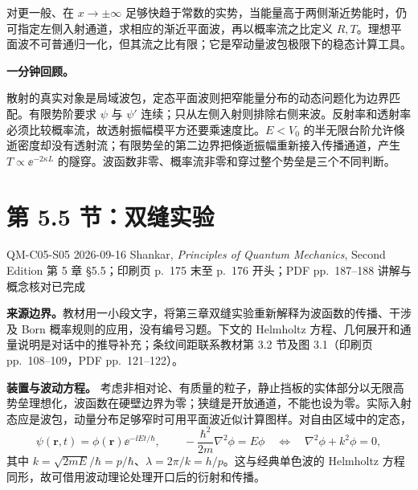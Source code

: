 对更一般、在 $x\to\pm\infty$ 足够快趋于常数的实势，当能量高于两侧渐近势能时，仍可指定左侧入射通道，求相应的渐近平面波，再以概率流之比定义 $R,T$。理想平面波不可普通归一化，但其流之比有限；它是窄动量波包极限下的稳态计算工具。

\textbf{一分钟回顾。}

散射的真实对象是局域波包，定态平面波则把窄能量分布的动态问题化为边界匹配。有限势阶要求 $\psi$ 与 $\psi'$ 连续；只从左侧入射则排除右侧来波。反射率和透射率必须比较概率流，故透射振幅模平方还要乘速度比。$E<V_0$ 的半无限台阶允许倏逝密度却没有透射流；有限势垒的第二边界把倏逝振幅重新接入传播通道，产生 $T\propto\ee^{-2\kappa L}$ 的隧穿。波函数非零、概率流非零和穿过整个势垒是三个不同判断。

\section{第 5.5 节：双缝实验}
\label{section:QM-C05-S05}

\studymeta
  {QM-C05-S05}
  {2026-09-16}
  {Shankar, \textit{Principles of Quantum Mechanics}, Second Edition}
  {第 5 章 \S 5.5；印刷页 p.~175 末至 p.~176 开头；PDF pp.~187--188}
  {讲解与概念核对已完成}

\textbf{来源边界。}教材用一小段文字，将第三章双缝实验重新解释为波函数的传播、干涉及 Born 概率规则的应用，没有编号习题。下文的 Helmholtz 方程、几何展开和通量说明是对话中的推导补充；条纹间距联系教材第 3.2 节及图 3.1（印刷页 pp.~108--109，PDF pp.~121--122）。



\textbf{装置与波动方程。}
考虑非相对论、有质量的粒子，静止挡板的实体部分以无限高势垒理想化，波函数在硬壁边界为零；狭缝是开放通道，不能也设为零。实际入射态应是波包，动量分布足够窄时可用平面波近似计算图样。对自由区域中的定态，
\begin{equation}
  \psi(\mathbf r,t)=\phi(\mathbf r)\ee^{-\ii Et/\hbar},
  \qquad
  -\frac{\hbar^2}{2m}\nabla^2\phi=E\phi
  \quad\Longleftrightarrow\quad
  \nabla^2\phi+k^2\phi=0,
  \label{eq:QM-C05-S05-helmholtz}
\end{equation}
其中 $k=\sqrt{2mE}/\hbar=p/\hbar$、$\lambda=2\pi/k=h/p$。这与经典单色波的 Helmholtz 方程同形，故可借用波动理论处理开口后的衍射和传播。

